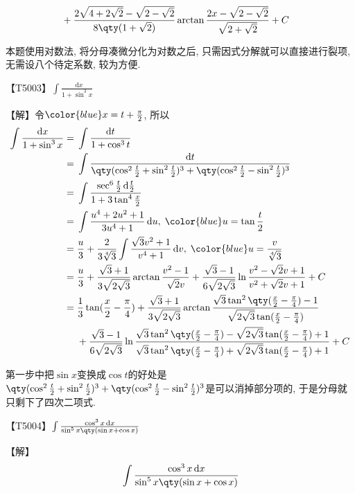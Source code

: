\documentclass{ctexbook}
\newcommand*{\dif}{\mathop{}\!\mathrm{d}}
\begin{document}
{\begin{align*}
{}&+\frac{2\sqrt{4+2\sqrt{2}}-\sqrt{2-\sqrt{2}}}{8\qty(1+\sqrt{2})}\arctan{\frac{2x-\sqrt{2-\sqrt{2}}}{\sqrt{2+\sqrt{2}}}}+C
\end{align*}\par
{\kaishu 本题使用对数法, 将分母凑微分化为对数之后, 只需因式分解就可以直接进行裂项, 无需设八个待定系数, 较为方便. \par}
【T5003】$\int\frac{\dif{x}}{1+\sin^{3}{x}}$\par
【解】令$\color{blue}x=t+\frac{\pi}{2}$, 所以
\begin{align*}
\int\frac{\dif{x}}{1+\sin^{3}{x}}={}&\int\frac{\dif{t}}{1+\cos^{3}{t}}\\
={}&\int\frac{\dif{t}}{\qty(\cos^{2}{\frac{t}{2}}+\sin^{2}{\frac{t}{2}})^{3}+\qty(\cos^{2}{\frac{t}{2}}-\sin^{2}{\frac{t}{2}})^{3}}\\
={}&\int\frac{\sec^{6}{\frac{t}{2}}\dif{\frac{t}{2}}}{1+3\tan^{4}{\frac{x}{2}}}\\
={}&\int\frac{u^{4}+2u^{2}+1}{3u^{4}+1}\dif{u},\;{\color{blue}u=\tan{\frac{t}{2}}}\\
={}&\frac{u}{3}+\frac{2}{3\sqrt[4]{3}}\int\frac{\sqrt{3}v^{2}+1}{v^{4}+1}\dif{v},\;{\color{blue}u=\frac{v}{\sqrt[4]{3}}}\\
={}&\frac{u}{3}+\frac{\sqrt{3}+1}{3\sqrt{2\sqrt{3}}}\arctan{\frac{v^{2}-1}{\sqrt{2}v}}+\frac{\sqrt{3}-1}{6\sqrt{2\sqrt{3}}}\ln{\frac{v^{2}-\sqrt{2}v+1}{v^{2}+\sqrt{2}v+1}}+C\\
={}&\frac{1}{3}\tan(\frac{x}{2}-\frac{\pi}{4})+\frac{\sqrt{3}+1}{3\sqrt{2\sqrt{3}}}\arctan{\frac{\sqrt{3}\tan^{2}\qty(\frac{x}{2}-\frac{\pi}{4})-1}{\sqrt{2\sqrt{3}}\tan(\frac{x}{2}-\frac{\pi}{4})}}\\
{}&+\frac{\sqrt{3}-1}{6\sqrt{2\sqrt{3}}}\ln{\frac{\sqrt{3}\tan^{2}\qty(\frac{x}{2}-\frac{\pi}{4})-\sqrt{2\sqrt{3}}\tan(\frac{x}{2}-\frac{\pi}{4})+1}{\sqrt{3}\tan^{2}\qty(\frac{x}{2}-\frac{\pi}{4})+\sqrt{2\sqrt{3}}\tan(\frac{x}{2}-\frac{\pi}{4})+1}}+C
\end{align*}\par
{\kaishu 第一步中把$\sin{x}$变换成$\cos{t}$的好处是$\qty(\cos^{2}{\frac{t}{2}}+\sin^{2}{\frac{t}{2}})^{3}+\qty(\cos^{2}{\frac{t}{2}}-\sin^{2}{\frac{t}{2}})^{3}$是可以消掉部分项的, 于是分母就只剩下了四次二项式. \par}
【T5004】$\int\frac{\cos^{3}{x}\dif{x}}{\sin^{5}{x}\qty(\sin{x}+\cos{x})}$\par
【解】
\begin{align*}
{}&\int\frac{\cos^{3}{x}\dif{x}}{\sin^{5}{x}\qty(\sin{x}+\cos{x})}\\

\end{align*}}
\end{document}
